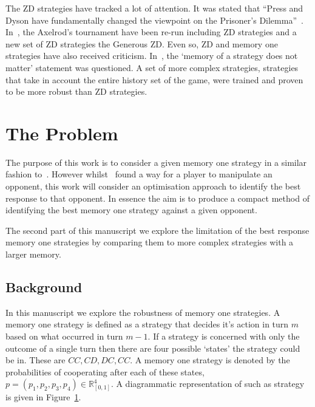 \documentclass[10pt]{article}
\newcommand{\R}{\mathbb{R}}
\begin{document}
The ZD strategies have tracked a lot of attention. It was stated that
``Press and Dyson have fundamentally changed the viewpoint on the Prisoner's
Dilemma''~\cite{Stewart2012}. In~\cite{Stewart2012}, the Axelrod's
tournament have been re-run including ZD strategies and a new set of ZD
strategies the Generous ZD. Even so, ZD and memory one strategies have
also received criticism. In~\cite{Harper2015}, the `memory of a strategy does
not matter' statement was questioned. A set of more complex strategies,
strategies that take in account the entire history set of the game, were
trained and proven to be more robust than ZD strategies.

\section{The Problem}

The purpose of this work is to consider a given memory one strategy 
in a similar fashion to~\cite{Press2012}. However whilst~\cite{Press2012} found
a way for a player to manipulate an opponent, this work will consider an
optimisation approach to identify the best response to that opponent.
In essence the aim is to produce a compact method of identifying the best memory
one strategy against a given opponent.

The second part of this manuscript we explore the limitation of the best response
memory one strategies by comparing them to more complex strategies with a larger
memory.

\subsection{Background}

In this manuscript we explore the robustness of memory one strategies.
A memory one strategy is defined as a strategy that decides it's action in turn
\(m\) based on what occurred in turn \(m - 1\). If a strategy is concerned with
only the outcome of a single turn then there are four possible `states' the
strategy could be in. These are \(CC, CD, DC,CC\). A memory one strategy is denoted
by the probabilities of cooperating after each of these states,
\(p=(p_1, p_2, p_3, p_4) \in \R_{[0,1]} ^ 4\). A diagrammatic representation of
such as strategy is given in Figure~\ref{fig:diagram_mem_one}.

\begin{figure}
    \centering
    \begin{subfigure}{0.45\textwidth}
        \centering
        
        \label{fig:diagram_mem_one}
    \end{subfigure}
    \begin{subfigure}{0.45\textwidth}
        \centering
        
        \label{fig:markov_chain}
    \end{subfigure}
\end{figure}
\end{document}
